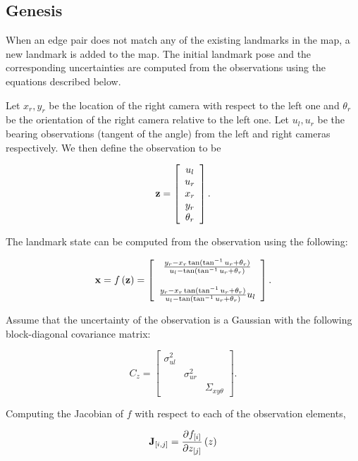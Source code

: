 \subsection{Genesis}

When an edge pair does not match any of the existing landmarks in
the map, a new landmark is added to the map. The initial landmark pose
and the corresponding uncertainties are computed from the observations
using the equations described below.

Let $x_r,y_r$ be the location of the right camera with respect to the
left one and $\theta_r$ be the orientation of the right camera
relative to the left one. Let $u_l,u_r$ be the bearing observations
(tangent of the angle) from the left and right cameras
respectively. We then define the observation to be

$$
{\bf z} =  \left[
    \begin{array}{c}
       u_l\\u_r\\x_r\\y_r\\\theta_r
    \end{array}
\right].
$$

The landmark state can be computed from the observation using the
following:

$$
{\bf x} = f\left({\bf z}\right) 
= \left[\begin{array}{c}
\frac{y_r - x_r\tan(\tan^{-1} u_r+\theta_r)}{u_l-\tan(\tan^{-1} u_r+\theta_r) }\\
{}\\
\frac{y_r - x_r\tan(\tan^{-1} u_r+\theta_r)}{u_l-\tan(\tan^{-1} u_r+\theta_r)}u_l
\end{array}
\right].
$$

Assume that the uncertainty of the observation is a Gaussian with
the following block-diagonal covariance matrix:

$$
C_z = \left[
  \begin{array}{ccc}
    \sigma^2_{ul} &             & \\
                & \sigma^2_{ur} & \\
                &             & \Sigma_{xy\theta}
  \end{array}
\right].
$$

Computing the Jacobian of $f$ with respect to each of the
observation elements,

$$
{\bf J}_{[i,j]} = \frac{\partial f_{[i]}}
{\partial z_{[j]}}\left(z \right)
$$

